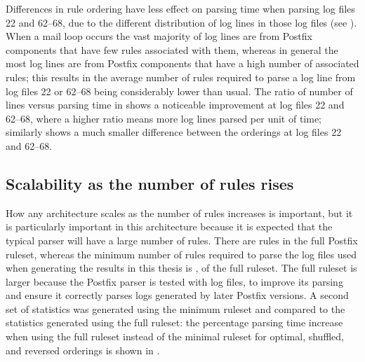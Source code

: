 
Differences in rule ordering have less effect on parsing time when parsing
log files 22 and 62--68, due to the different distribution of log lines in
those log files (see ).
When a mail loop occurs the vast majority of log lines are from Postfix
components that have few rules associated with them, whereas in general the
most log lines are from Postfix components that have a high number of
associated rules; this results in the average number of rules required to
parse a log line from log files 22 or 62--68 being considerably lower than
usual.  The ratio of number of lines versus parsing time in
 shows a
noticeable improvement at log files 22 and 62--68, where a higher ratio
means more log lines parsed per unit of time; similarly  shows a much smaller difference
between the orderings at log files 22 and 62--68.

\subsection{Scalability as the number of rules rises}

\label{scalability as the number of rules rises}

How any architecture scales as the number of rules increases is important,
but it is particularly important in this architecture because it is
expected that the typical parser will have a large number of rules.  There
are \numberOFrules{} rules in the full Postfix ruleset, whereas the minimum
number of rules required to parse the \numberOFlogFILES{} log files used
when generating the results in this thesis is \numberOFrulesMINIMUM{},
\numberOFrulesMINIMUMpercentage{} of the full ruleset.  The full ruleset is
larger because the Postfix parser is tested with \numberOFlogFILESall{} log
files, to improve its parsing and ensure it correctly parses logs generated
by later Postfix versions.  A second set of statistics was generated using
the minimum ruleset and compared to the statistics generated using the full
ruleset: the percentage parsing time increase when using the full ruleset
instead of the minimal ruleset for optimal, shuffled, and reversed
orderings is shown in .

